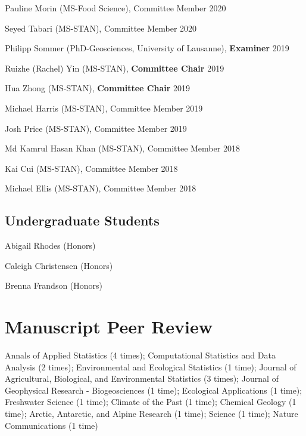 \documentclass[11pt,]{article}
\providecommand{\tightlist}{%
  \setlength{\itemsep}{0pt}\setlength{\parskip}{0pt}}
\renewenvironment{itemize}{
  \begin{list}{}{
    \setlength{\leftmargin}{1.5em}
  }
}{
  \end{list}
}
\begin{document}
\begin{itemize}
\tightlist
\item
  Pauline Morin (MS-Food Science), Committee Member \hfill 2020
\item
  Seyed Tabari (MS-STAN), Committee Member \hfill 2020
\item
  Philipp Sommer (PhD-Geosciences, University of Lausanne),
  \textbf{Examiner} \hfill 2019
\item
  Ruizhe (Rachel) Yin (MS-STAN), \textbf{Committee Chair} \hfill 2019
\item
  Hua Zhong (MS-STAN), \textbf{Committee Chair} \hfill 2019
\item
  Michael Harris (MS-STAN), Committee Member \hfill 2019
\item
  Josh Price (MS-STAN), Committee Member \hfill 2019
\item
  Md Kamrul Hasan Khan (MS-STAN), Committee Member \hfill 2018
\item
  Kai Cui (MS-STAN), Committee Member \hfill 2018
\item
  Michael Ellis (MS-STAN), Committee Member \hfill 2018
\end{itemize}

\hypertarget{undergraduate-students}{%
\subsection{Undergraduate Students}\label{undergraduate-students}}

\begin{itemize}
\tightlist
\item
  Abigail Rhodes (Honors)
\item
  Caleigh Christensen (Honors)
\item
  Brenna Frandson (Honors)
\end{itemize}

\hypertarget{manuscript-peer-review}{%
\section{Manuscript Peer Review}\label{manuscript-peer-review}}

Annals of Applied Statistics (4 times); Computational Statistics and
Data Analysis (2 times); Environmental and Ecological Statistics (1
time); Journal of Agricultural, Biological, and Environmental Statistics
(3 times); Journal of Geophysical Research - Biogeosciences (1 time);
Ecological Applications (1 time); Freshwater Science (1 time); Climate
of the Past (1 time); Chemical Geology (1 time); Arctic, Antarctic, and
Alpine Research (1 time); Science (1 time); Nature Communications (1
time)
\end{document}
